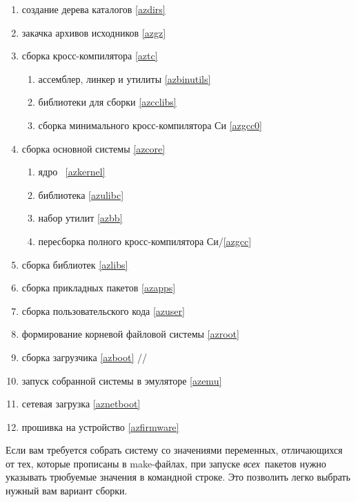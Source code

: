 \begin{enumerate}
  \item {} создание дерева каталогов \ref{azdirs} 
  \item {} закачка архивов исходников \ref{azgz} 
  \item {} сборка кросс-компилятора \ref{aztc}
  \begin{enumerate}
    \item {} ассемблер, линкер и утилиты \ref{azbinutils}
    \item {} библиотеки для сборки  \ref{azcclibs}
    \item {} сборка минимального кросс-компилятора Си \ref{azgcc0}
  \end{enumerate}
  \item {} сборка основной системы \ref{azcore}
  \begin{enumerate}
    \item {} ядро \linux\ \ref{azkernel}
    \item {} библиотека  \ref{azulibc}
    \item {} набор утилит  \ref{azbb}
    \item {} пересборка полного кросс-компилятора Си/\cpp \ref{azgcc}
  \end{enumerate}
  \item {} сборка библиотек  \ref{azlibs}
  \item {} сборка прикладных пакетов  \ref{azapps}
  \item {} сборка пользовательского кода \ref{azuser}
  \item {} формирование корневой файловой системы \ref{azroot}
  \item {} сборка загрузчика \ref{azboot}
   //
  \item {} запуск собранной системы в эмуляторе \ref{azemu}
  \item {} сетевая загрузка \ref{aznetboot}
  \item {} прошивка на устройство \ref{azfirmware}
\end{enumerate}


Если вам требуется собрать систему со значениями переменных, отличающихся от
тех, которые прописаны в make-файлах, при запуске \emph{всех}\ пакетов нужно
указывать трюбуемые значения в командной строке. Это позволить легко выбрать
нужный вам вариант сборки.

